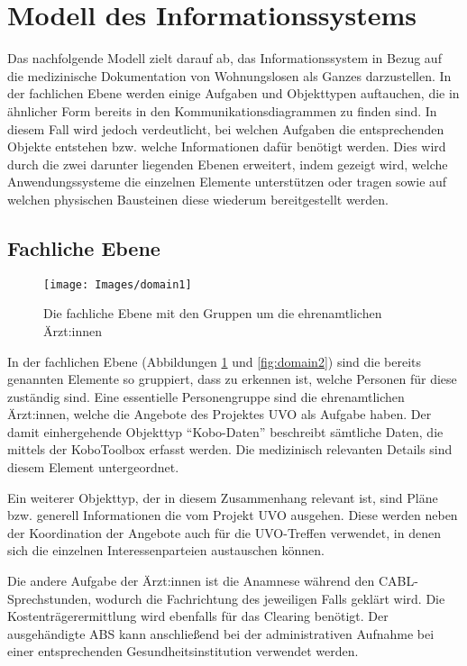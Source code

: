 \section{Modell des Informationssystems}

Das nachfolgende Modell zielt darauf ab, das Informationssystem in Bezug auf die medizinische Dokumentation von Wohnungslosen als Ganzes darzustellen. In der fachlichen Ebene werden einige Aufgaben und Objekttypen auftauchen, die in ähnlicher Form bereits in den Kommunikationsdiagrammen zu finden sind. In diesem Fall wird jedoch verdeutlicht, bei welchen Aufgaben die entsprechenden Objekte entstehen bzw. welche Informationen dafür benötigt werden. Dies wird durch die zwei darunter liegenden Ebenen erweitert, indem gezeigt wird, welche Anwendungssysteme die einzelnen Elemente unterstützen oder tragen sowie auf welchen physischen Bausteinen diese wiederum bereitgestellt werden.

\subsection{Fachliche Ebene}

\begin{figure}[h]
	\centering
	\texttt{[image: Images/domain1]}
	\caption[Fachliche Ebene - Teil 1]{Die fachliche Ebene mit den Gruppen um die ehrenamtlichen Ärzt:innen}
	\label{fig:domain1}
\end{figure}

In der fachlichen Ebene (Abbildungen \ref{fig:domain1} und \ref{fig:domain2}) sind die bereits genannten Elemente so gruppiert, dass zu erkennen ist, welche Personen für diese zuständig sind. Eine essentielle Personengruppe sind die ehrenamtlichen Ärzt:innen, welche die Angebote des Projektes \ac{UVO} als Aufgabe haben. Der damit einhergehende Objekttyp \enquote{Kobo-Daten} beschreibt sämtliche Daten, die mittels der KoboToolbox erfasst werden. Die medizinisch relevanten Details sind diesem Element untergeordnet.

Ein weiterer Objekttyp, der in diesem Zusammenhang relevant ist, sind Pläne bzw. generell Informationen die vom Projekt \ac{UVO} ausgehen. Diese werden neben der Koordination der Angebote auch für die UVO-Treffen verwendet, in denen sich die einzelnen Interessenparteien austauschen können.

Die andere Aufgabe der Ärzt:innen ist die Anamnese während den CABL-Sprechstunden, wodurch die Fachrichtung des jeweiligen Falls geklärt wird. Die Kostenträgerermittlung wird ebenfalls für das Clearing benötigt. Der ausgehändigte \ac{ABS} kann anschließend bei der administrativen Aufnahme bei einer entsprechenden Gesundheitsinstitution verwendet werden.

